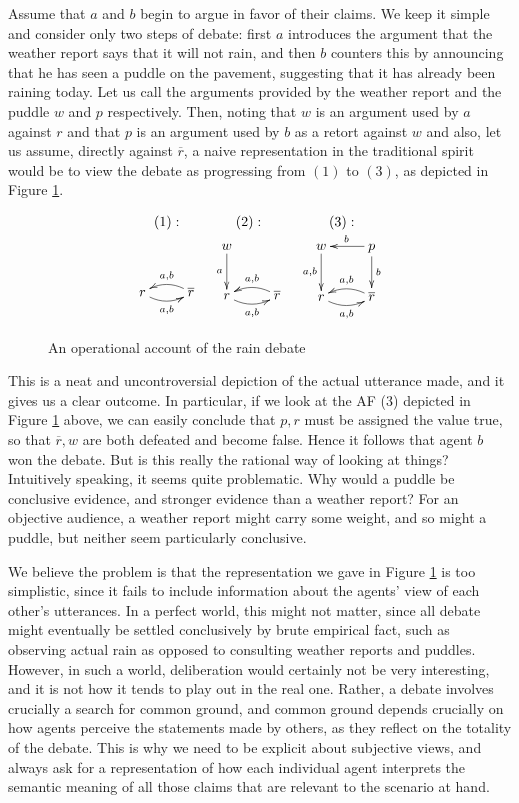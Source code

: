 \documentclass[greybox]{svmult}
\renewcommand{\bar}[1]{\overline{#1}}
\begin{document}
Assume that $a$ and $b$ begin to argue in favor of their claims. We keep it simple and consider only two steps of debate: first $a$ introduces the argument that the weather report says that it will not rain, and then $b$ counters this by announcing that he has seen a puddle on the pavement, suggesting that it has already been raining today. Let us call the arguments provided by the weather report and the puddle $w$ and $p$ respectively. Then, noting that $w$ is an argument used by $a$ against $r$ and that $p$ is an argument used by $b$ as a retort against $w$ and also, let us assume, directly against $\bar r$, a naive representation in the traditional spirit would be to view the debate as progressing from $(1)$ to $(3)$, as depicted in Figure \ref{fig:wrong}.
\begin{figure}
$$
\begin{array}{ccc}
(1): & (2): & (3): \\
\xymatrix{ \\ r\ar@/_/[r]_{a,b} & \bar{r}\ar@/_/[l]_{a,b} } &
\xymatrix{
        w\ar[d]_{a} & \\
        r\ar@/_/[r]_{a,b} & \bar{r}\ar@/_/[l]_{a,b} } &
\xymatrix{
        w\ar[d]_{a,b} & p \ar[l]_{b} \ar[d]^{b} \\
        r\ar@/_/[r]_{{a},{b}} & \bar{r}\ar@/_/[l]_{{a},{b}} }
\end{array}
$$
\caption{An operational account of the rain debate}
\label{fig:wrong}
\end{figure}

This is a neat and uncontroversial depiction of the actual utterance made, and it gives us a clear outcome. In particular, if we look at the AF (3) depicted in Figure \ref{fig:wrong} above, we can easily conclude that $p, r$ must be assigned the value true, so that $\bar r, w$ are both defeated and become false. Hence it follows that agent ${b}$ won the debate. But is this really the rational way of looking at things?  Intuitively speaking, it seems quite problematic. Why would a puddle be conclusive evidence, and stronger evidence than a weather report? For an objective audience, a weather report might carry some weight, and so might a puddle, but neither seem particularly conclusive.

We believe the problem is that the representation we gave in Figure \ref{fig:wrong} is too simplistic, since it fails to include information about the agents' view of each other's utterances. In a perfect world, this might not matter, since all debate might eventually be settled conclusively by brute empirical fact, such as observing actual rain as opposed to consulting weather reports and puddles. However, in such a world, deliberation would certainly not be very interesting, and it is not how it tends to play out in the real one. Rather, a debate involves crucially a search for common ground, and common ground depends crucially on how agents perceive the statements made by others, as they reflect on the totality of the debate. This is why we need to be explicit about subjective views, and always ask for a representation of how each individual agent interprets the semantic meaning of all those claims that are relevant to the scenario at hand.
\end{document}
